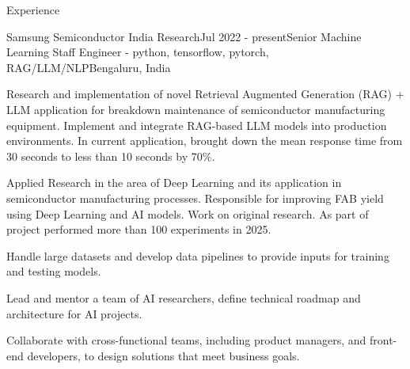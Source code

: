 \documentclass{resume}
\begin{document}
  \begin{rSection}{Experience}

    \begin{rSubsection}{Samsung Semiconductor India Research}{Jul 2022 - present}{Senior Machine Learning Staff Engineer - python, tensorflow, pytorch, RAG/LLM/NLP}{Bengaluru, India}
    \item Research and implementation of novel Retrieval Augmented Generation (RAG) + LLM application for breakdown maintenance of semiconductor manufacturing equipment. Implement and integrate RAG-based LLM models into production environments. In current application, brought down the mean response time from 30 seconds to less than 10 seconds by 70\%.
    \item Applied Research in the area of Deep Learning and its application in semiconductor manufacturing processes. Responsible for improving FAB yield using Deep Learning and AI models. Work on original research. As part of project performed more than 100 experiments in 2025.
    \item Handle large datasets and develop data pipelines to provide inputs for training and testing models.
    \item Lead and mentor a team of AI researchers, define technical roadmap and architecture for AI projects.
    \item Collaborate with cross-functional teams, including product managers, and front-end developers, to design solutions that meet business goals.
    \end{rSubsection}
  

\end{rSection}
\end{document}
